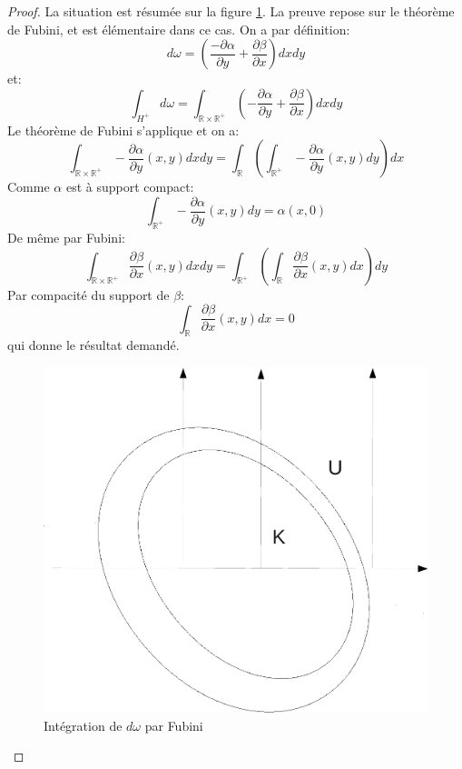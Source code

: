 \begin{proof}
La situation est résumée sur la figure \ref{ch8:fig7}. La preuve repose sur le
théorème de Fubini, et est élémentaire dans ce cas. On a par définition:
\[
d \omega = \left( \frac{- \partial \alpha }{\partial y} + \frac{\partial
\beta}{\partial x} \right) dx dy
\] 
et:
\[
\int_{H^+} d\omega = \int_{\mathbb{R}\times \mathbb{R}^+}  \left(-
\frac{\partial \alpha }{\partial y} + \frac{\partial \beta}{\partial x} \right) dxdy
\]
Le théorème de Fubini s'applique et on a:
\[
\int_{\mathbb{R}\times \mathbb{R}^+}-\frac{ \partial \alpha }{\partial
y}(x,y)dxdy = \int_{\mathbb{R}} \left(\int_{\mathbb{R}^+} -\frac{\partial \alpha
}{\partial y}(x,y)dy \right) dx
\]
Comme $\alpha$ est à support compact:
\[
\int_{\mathbb{R}^+} -\frac{\partial \alpha }{\partial
y}(x,y)dy = \alpha(x,0)
\]
De même par Fubini:
\[
\int_{\mathbb{R}\times \mathbb{R}^+}\frac{\partial \beta }{\partial
x}(x,y)dxdy = \int_{\mathbb{R}^+} \left(\int_{\mathbb{R}} \frac{\partial
\beta }{\partial x}(x,y)dx \right) dy
\]
Par compacité du support de $\beta$:
\[
\int_{\mathbb{R}} \frac{\partial
\beta }{\partial x}(x,y)dx = 0
\]
qui donne le résultat demandé.
 \begin{figure}[ht]
\begin{center}
\includegraphics[scale=0.3]{images/stokes_elem.pdf}
\end{center}
\caption{Intégration de $d\omega$ par Fubini}\label{ch8:fig7}
\end{figure}
\end{proof}
